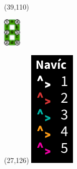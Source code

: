\documentclass{extarticle}
\begin{document}
\begin{textblock}{0}(39,110)
\vfill
{\centerline{\includegraphics[height=14mm]{tools/images/segment-numbering.pdf}}} 
\vfill
\end{textblock}

\begin{textblock}{0}(27,126)%
\vfill
{\includegraphics[scale=0.6333]{tools/navic-var.pdf}}
\vfill
\end{textblock}
\end{document}
